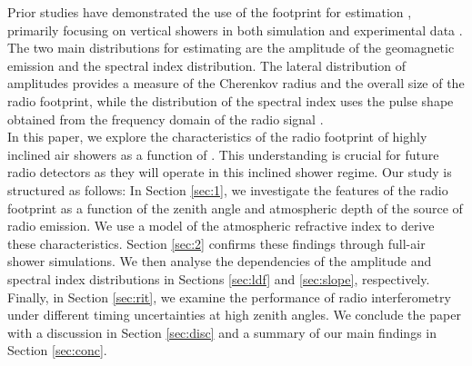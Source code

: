 Prior studies have demonstrated the use of the footprint for \xmax estimation \cite{DEVRIES201323}, primarily focusing on vertical showers in both simulation and experimental data \cite{LOFARNATURE}. The two main distributions for estimating \xmax are the amplitude of the geomagnetic emission and the spectral index distribution. The lateral distribution of amplitudes provides a measure of the Cherenkov radius and the overall size of the radio footprint, while the distribution of the spectral index uses the pulse shape obtained from the frequency domain of the radio signal \cite{Grebe2013}.\\In this paper, we explore the characteristics of the radio footprint of highly inclined air showers as a function of \xmax. This understanding is crucial for future radio detectors as they will operate in this inclined shower regime. Our study is structured as follows: In Section \ref{sec:1}, we investigate the features of the radio footprint as a function of the zenith angle and atmospheric depth of the source of radio emission. We use a model of the atmospheric refractive index to derive these characteristics. Section \ref{sec:2} confirms these findings through full-air shower simulations. We then analyse the \xmax dependencies of the amplitude and spectral index distributions in Sections \ref{sec:ldf} and \ref{sec:slope}, respectively. Finally, in Section \ref{sec:rit}, we examine the performance of radio interferometry under different timing uncertainties at high zenith angles. We conclude the paper with a discussion in Section \ref{sec:disc} and a summary of our main findings in Section \ref{sec:conc}.

